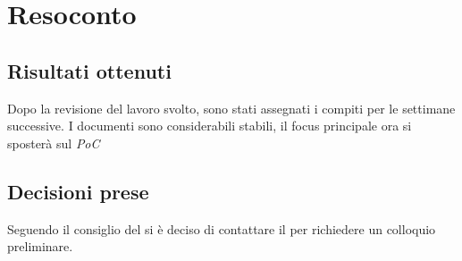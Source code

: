\section{Resoconto}

\subsection{Risultati ottenuti}
Dopo la revisione del lavoro svolto, sono stati assegnati i compiti per le settimane successive. I documenti sono considerabili stabili, il focus principale ora si sposterà sul \textit{PoC}

\subsection{Decisioni prese}
Seguendo il consiglio del \vardanega si è deciso di contattare il \cardin per richiedere un colloquio preliminare.